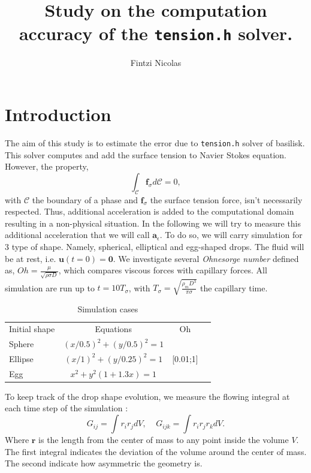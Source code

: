 \documentclass[10pt,a4paper,openany]{article}
\title{Study on the computation accuracy of the \texttt{tension.h} solver.}
\author{Fintzi Nicolas}
\theoremstyle{mytheoremstyle}
\theoremstyle{mytheoremstyle}
\theoremstyle{myproblemstyle}
\begin{document}
\maketitle
\section{Introduction}
The aim of this study is to estimate the error due to \texttt{tension.h} solver of basilisk. 
This solver computes and add the surface tension to Navier Stokes equation. 
However, the property, 
\begin{equation*}
    \int_\mathcal{C} \bm{f}_\sigma d\mathcal{C}= 0,
\end{equation*}
with $\mathcal{C}$ the boundary of a phase and $\bm{f}_\sigma$ the surface tension force, isn't necessarily respected.
Thus, additional acceleration is added to the computational domain resulting in a non-physical situation. 
In the following we will try to measure this additional acceleration that we will call $\bm{a}_\epsilon$.
To do so, we will carry simulation for 3 type of shape.
Namely, spherical, elliptical and egg-shaped drops. 
The fluid will be at rest, i.e. $\textbf{u}(t=0) = \textbf{0}$. 
We investigate several \textit{Ohnesorge number} defined as, $Oh =\frac{\mu}{\sqrt{\rho \sigma D}}$, which compares viscous forces with capillary forces.
All simulation are run up to $t = 10T_\sigma$, with $T_\sigma = \sqrt{\frac{\rho_m D^3}{\pi \sigma}}$ the capillary time.
\begin{table}[!h]
    \centering
    \caption{Simulation cases}
    \begin{tabular}{lccc}
        \hline
        Initial shape     & Equations                   & Oh &  \\
        Sphere    & $(x/0.5)^2+(y/0.5)^2=1 $            &    &  \\
        Ellipse   & $(x/1)^2+(y/0.25)^2=1 $    &  [0.01;1]  &  \\
        Egg       & $x^2+y^2 (1+1.3 x) = 1$ &    &  \\
        \hline
    \end{tabular}
\end{table}
To keep track of the drop shape evolution, we measure the flowing integral at each time step of the simulation :
\begin{equation*}
    G_{ij} = \int r_ir_j dV, 
    \;\;\;\;
    G_{ijk} = \int r_ir_jr_k dV.
\end{equation*}
Where $\bm{r}$ is the length from the center of mass to any point inside the volume $V$. 
The first integral indicates the deviation of the volume around the center of mass. 
The second indicate how asymmetric the geometry is. 
\end{document}
